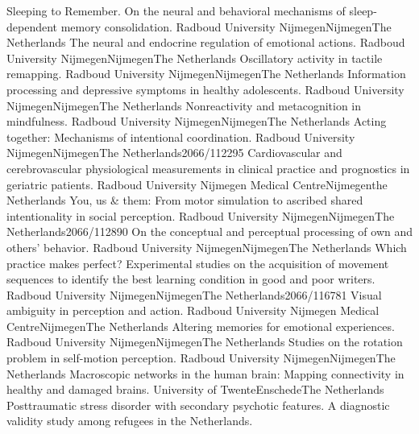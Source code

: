 	{Sleeping to Remember. On the neural and behavioral mechanisms of sleep-dependent memory consolidation.}
	{Radboud University Nijmegen}{Nijmegen}{The Netherlands}{}
	{The neural and endocrine regulation of emotional actions.}
	{Radboud University Nijmegen}{Nijmegen}{The Netherlands}{}
	{Oscillatory activity in tactile remapping.}
	{Radboud University Nijmegen}{Nijmegen}{The Netherlands}{}
	{Information processing and depressive symptoms in healthy adolescents.}
	{Radboud University Nijmegen}{Nijmegen}{The Netherlands}{}
	{Nonreactivity and metacognition in mindfulness.}
	{Radboud University Nijmegen}{Nijmegen}{The Netherlands}{}
	{Acting together: Mechanisms of intentional coordination.}
	{Radboud University Nijmegen}{Nijmegen}{The Netherlands}{2066/112295}
	{Cardiovascular and cerebrovascular physiological measurements in clinical practice and prognostics in geriatric patients.}
	{Radboud University Nijmegen Medical Centre}{Nijmegen}{the Netherlands}{}
	{ You, us \& them: From motor simulation to ascribed shared intentionality in social perception.}
	{Radboud University Nijmegen}{Nijmegen}{The Netherlands}{2066/112890}
	{On the conceptual and perceptual processing of own and others’ behavior.}
	{Radboud University Nijmegen}{Nijmegen}{The Netherlands}{}
	{Which practice makes perfect? Experimental studies on the acquisition of movement sequences to identify the best learning condition in good and poor writers.}
	{Radboud University Nijmegen}{Nijmegen}{The Netherlands}{2066/116781}
	{Visual ambiguity in perception and action.}
	{Radboud University Nijmegen Medical Centre}{Nijmegen}{The Netherlands}{}
	{Altering memories for emotional experiences.}
	{Radboud University Nijmegen}{Nijmegen}{The Netherlands}{}
	{ Studies on the rotation problem in self-motion perception.}
	{Radboud University Nijmegen}{Nijmegen}{The Netherlands}{}
	{ Macroscopic networks in the human brain: Mapping connectivity in healthy and damaged brains.}
	{University of Twente}{Enschede}{The Netherlands}{}
	{Posttraumatic stress disorder with secondary psychotic features. A diagnostic validity study among refugees in the Netherlands.}
